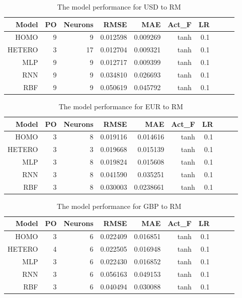\documentclass[journal]{IEEEtran}
\begin{document}
\begin{table}[ht]
	\centering
	\begin{tabular}{@{}rrrrrrrrrr@{}}
		\toprule
		\textbf{Model} &\textbf{PO}&\textbf{Neurons}& \textbf{RMSE} & \textbf{MAE} & \textbf{Act\_F} & \textbf{LR} \\
		\midrule
		
		HOMO	& 9 & 9 & 0.012598 & 0.009269 & tanh & 0.1 \\ 	
		HETERO	& 3 & 17 & 0.012704 & 0.009321 & tanh & 0.1  \\
		MLP	&  9 & 9 & 0.012717 &  0.009399 & tanh & 0.1 \\	
		RNN	&  9 & 9 & 0.034810 &  0.026693 & tanh & 0.1 \\
		RBF	&  9 & 9 & 0.050619 & 0.045792 & tanh & 0.1  \\
		\hline
	\end{tabular}
	\hspace*{3cm}
	\caption{The model performance for USD to RM }
\end{table}

\begin{table}[ht]
	\centering
	\begin{tabular}{@{}rrrrrrrrrr@{}}
		\toprule
		\textbf{Model} &\textbf{PO}&\textbf{Neurons}& \textbf{RMSE} & \textbf{MAE} & \textbf{Act\_F} & \textbf{LR} \\
		\midrule
		
			HOMO	& 3 & 8 & 0.019116 & 0.014616 & tanh & 0.1  \\ 	
			HETERO	&3 & 3 & 0.019668 & 0.015139 & tanh & 0.1  \\
			MLP	& 3 & 8 & 0.019824 &  0.015608 & tanh & 0.1 \\	
			RNN	&  3 & 8 & 0.041590 & 0.035251 & tanh & 0.1 \\
			RBF	& 3 & 8 & 0.030003 & 0.0238661 & tanh & 0.1  \\
		\hline
	\end{tabular}
	\hspace*{3cm}
	\caption{The model performance for EUR to RM }
\end{table}

\begin{table}[ht]
	\centering
	\begin{tabular}{@{}rrrrrrrrrr@{}}
		\toprule
		\textbf{Model} &\textbf{PO}&\textbf{Neurons}& \textbf{RMSE} & \textbf{MAE} & \textbf{Act\_F} & \textbf{LR} \\
		\midrule
		
		HOMO	& 3 & 6 & 0.022409 & 0.016851 & tanh & 0.1 \\
		HETERO	&4 & 6 & 0.022505 & 0.016948 & tanh & 0.1  \\ 
		MLP	&  3 & 6 & 0.022430 &  0.016852 & tanh & 0.1 \\	
		RNN	& 3 & 6 & 0.056163 & 0.049153 & tanh & 0.1 \\
		RBF	& 3 & 6 & 0.040494 & 0.030088 & tanh & 0.1  \\
		\hline
	\end{tabular}
	\hspace*{3cm}
	\caption{The model performance for GBP to RM }
\end{table}
\end{document}
